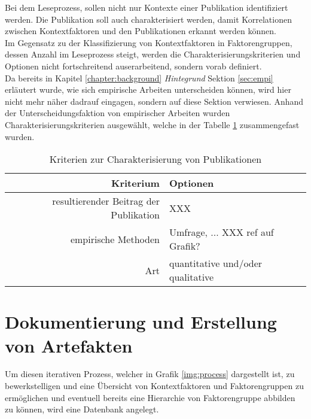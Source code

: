 Bei dem Leseprozess, sollen nicht nur Kontexte einer Publikation identifiziert werden. Die Publikation soll auch charakterisiert werden, damit Korrelationen zwischen Kontextfaktoren und den Publikationen erkannt werden können. \\

Im Gegensatz zu der Klassifizierung von Kontextfaktoren in Faktorengruppen, dessen Anzahl im Leseprozess steigt, werden die Charakterisierungskriterien und Optionen nicht fortschreitend auserarbeitend, sondern vorab definiert. \\
Da bereits in Kapitel \ref{chapter:background} \textit{Hintegrund} Sektion \ref{sec:empi} erläutert wurde, wie sich empirische Arbeiten unterscheiden können, wird hier nicht mehr näher dadrauf eingagen, sondern auf diese Sektion verwiesen. Anhand der Unterscheidungsfaktion von empirischer Arbeiten wurden Charakterisierungskriterien ausgewählt, welche in der Tabelle \ref{table:character} zusammengefast wurden. \\

\begin{table}[h!]
\begin{tabular}{ r | l }
 Kriterium & Optionen \\ 
  \hline
  resultierender Beitrag der Publikation & XXX \\  
  empirische Methoden & Umfrage, ... XXX ref auf Grafik? \\
  Art & quantitative und/oder qualitative \\
\end{tabular}
\caption{Kriterien zur Charakterisierung von Publikationen}
\label{table:character}
\end{table}




\section{Dokumentierung und Erstellung von Artefakten}
Um diesen iterativen Prozess, welcher in Grafik \ref{img:process} dargestellt ist, zu bewerkstelligen und eine Übersicht von Kontextfaktoren und Faktorengruppen zu ermöglichen und eventuell bereits eine Hierarchie von Faktorengruppe abbilden zu können, wird eine Datenbank angelegt. \\



